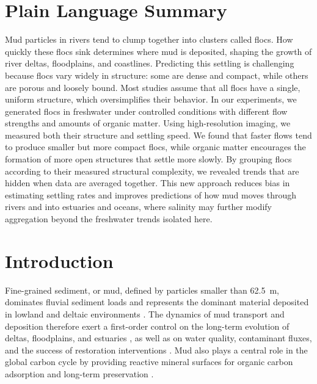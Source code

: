 \documentclass{agujournal2019}
\begin{document}
\section*{Plain Language Summary}
Mud particles in rivers tend to clump together into clusters called flocs. How quickly these flocs sink determines where mud is deposited, shaping the growth of river deltas, floodplains, and coastlines. Predicting this settling is challenging because flocs vary widely in structure: some are dense and compact, while others are porous and loosely bound. Most studies assume that all flocs have a single, uniform structure, which oversimplifies their behavior. In our experiments, we generated flocs in freshwater under controlled conditions with different flow strengths and amounts of organic matter. Using high-resolution imaging, we measured both their structure and settling speed. We found that faster flows tend to produce smaller but more compact flocs, while organic matter encourages the formation of more open structures that settle more slowly. By grouping flocs according to their measured structural complexity, we revealed trends that are hidden when data are averaged together. This new approach reduces bias in estimating settling rates and improves predictions of how mud moves through rivers and into estuaries and oceans, where salinity may further modify aggregation beyond the freshwater trends isolated here.

\section{Introduction}

Fine-grained sediment, or mud, defined by particles smaller than 62.5~\textmu m, dominates fluvial sediment loads and represents the dominant material deposited in lowland and deltaic environments \cite{healy2002muddy, kranenburg1994fractal, lamb2020mud, nghiem2026flocculated}. The dynamics of mud transport and deposition therefore exert a first-order control on the long-term evolution of deltas, floodplains, and estuaries \cite{nghiem2022mechanistic, winterwerp2002flocculation}, as well as on water quality, contaminant fluxes, and the success of restoration interventions \cite{droppo1997freshwater, esposito2017efficient, kemp2016enhancing, liss1996floc}. Mud also plays a central role in the global carbon cycle by providing reactive mineral surfaces for organic carbon adsorption and long-term preservation \cite{bianchi2024anthropogenic, blair2012fate}.
\end{document}
